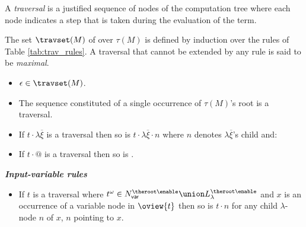 A \emph{traversal} is a justified sequence of nodes of the computation tree where each node
indicates a step that is taken during the evaluation of the term.

\begin{definition} \rm
\label{def:traversal} The set $\travset(M)$ of 
over $\tau(M)$ is defined by induction over the rules of Table
\ref{tab:trav_rules}. A traversal that cannot be extended by any
rule is said to be \emph{maximal}.
\end{definition}
\begin{FramedTable}
\begin{itemize}[]
\item{} $\epsilon \in \travset(M)$.
\item{} The sequence constituted of a single occurrence of $\tau(M)$'s root is a traversal.
\end{itemize}

\begin{itemize}[]
    \item {} If $t \cdot \lambda \overline{\xi}$ is a traversal then so is
        $t \cdot \lambda \overline{\xi} \cdot n$ where $n$
        denotes $\lambda \overline{\xi}$'s child and:
    \item {} If $t \cdot @$ is a traversal then so is .
\end{itemize}

\emph{\bf Input-variable rules}
\begin{itemize}[]
\item {} If $t$ is a traversal where $t^\omega \in N_{\sf var}^{\theroot\enable} \union L_\lambda^{\theroot\enable}$
and $x$ is an occurrence of a variable node in $\oview{t}$ then
so is $t \cdot n$ for any child $\lambda$-node $n$ of $x$, $n$
pointing to $x$.




\end{itemize}
\end{FramedTable}
